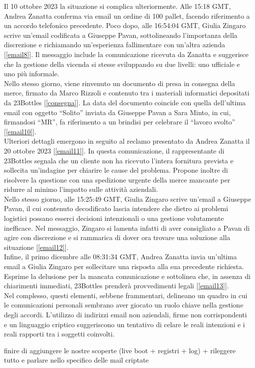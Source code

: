 Il 10 ottobre 2023 la situazione si complica ulteriormente. Alle 15:18 GMT, Andrea Zanatta conferma via email un ordine di 100 pallet, facendo riferimento a un accordo telefonico precedente. Poco dopo, alle 16:54:04 GMT, Giulia Zingaro scrive un’email codificata a Giuseppe Pavan, sottolineando l’importanza della discrezione e richiamando un’esperienza fallimentare con un’altra azienda [\ref{email8}]. Il messaggio include la comunicazione ricevuta da Zanatta e suggerisce che la gestione della vicenda si stesse sviluppando su due livelli: uno ufficiale e uno più informale.\\
Nello stesso giorno, viene rinvenuto un documento di presa in consegna della merce, firmato da Marco Rizzoli e contenuto tra i materiali informatici depositati da 23Bottles [\ref{consegna}]. La data del documento coincide con quella dell’ultima email con oggetto “Solito” inviata da Giuseppe Pavan a Sara Minto, in cui, firmandosi “MR”, fa riferimento a un brindisi per celebrare il “lavoro svolto” [\ref{email10}].\vspace{14pt}\\
Ulteriori dettagli emergono in seguito al reclamo presentato da Andrea Zanatta il 20 ottobre 2023 [\ref{email11}]. In questa comunicazione, il rappresentante di 23Bottles segnala che un cliente non ha ricevuto l’intera fornitura prevista e sollecita un’indagine per chiarire le cause del problema. Propone inoltre di risolvere la questione con una spedizione urgente della merce mancante per ridurre al minimo l’impatto sulle attività aziendali.\\
Nello stesso giorno, alle 15:25:49 GMT, Giulia Zingaro scrive un’email a Giuseppe Pavan, il cui contenuto decodificato lascia intendere che dietro ai problemi logistici possano esserci decisioni intenzionali o una gestione volutamente inefficace. Nel messaggio, Zingaro si lamenta infatti di aver consigliato a Pavan di agire con discrezione e si rammarica di dover ora trovare una soluzione alla situazione [\ref{email12}].\vspace{14pt}\\
Infine, il primo dicembre alle 08:31:34 GMT, Andrea Zanatta invia un’ultima email a Giulia Zingaro per sollecitare una risposta alla sua precedente richiesta. Esprime la delusione per la mancata comunicazione e sottolinea che, in assenza di chiarimenti immediati, 23Bottles prenderà provvedimenti legali [\ref{email13}].\vspace{14pt}\\
Nel complesso, questi elementi, sebbene frammentari, delineano un quadro in cui le comunicazioni personali sembrano aver giocato un ruolo chiave nella gestione degli accordi. L’utilizzo di indirizzi email non aziendali, firme non corrispondenti e un linguaggio criptico suggeriscono un tentativo di celare le reali intenzioni e i reali rapporti tra i soggetti coinvolti.


finire di aggiungere le nostre scoperte (live boot + registri + log) + rileggere tutto e parlare nello specifico delle mail criptate